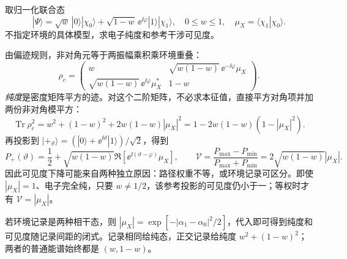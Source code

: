 \begin{exbox}[不等权两通道的纯度与干涉可见度]
取归一化联合态
\begin{equation*}
 |\Psi\rangle=\sqrt{w}\,|0\rangle|\chi_0\rangle
 +\sqrt{1-w}\,\ee^{\ii\varphi}|1\rangle|\chi_1\rangle,
 \quad 0\le w\le1,\quad \mu_X=\langle\chi_1|\chi_0\rangle.
\end{equation*}
不指定环境的具体模型，求电子纯度和参考干涉可见度。

由偏迹规则，非对角元等于两振幅乘积乘环境重叠：
\begin{equation*}
 \rho_e=\begin{pmatrix}
 w&\sqrt{w(1-w)}\,\ee^{-\ii\varphi}\mu_X\\
 \sqrt{w(1-w)}\,\ee^{\ii\varphi}\mu_X^*&1-w
 \end{pmatrix}.
\end{equation*}
\emph{纯度}是密度矩阵平方的迹。对这个二阶矩阵，不必求本征值，直接平方对角项并加两份非对角模平方：
\begin{equation*}
 \operatorname{Tr}\rho_e^2
 =w^2+(1-w)^2+2w(1-w)|\mu_X|^2
 =1-2w(1-w)(1-|\mu_X|^2).
\end{equation*}
再投影到 $|+_\vartheta\rangle=(|0\rangle+\ee^{\ii\vartheta}|1\rangle)/\sqrt2$，得到
\begin{equation*}
 P_+(\vartheta)=\frac12+\sqrt{w(1-w)}
 \Re[\ee^{\ii(\vartheta-\varphi)}\mu_X],\qquad
 \mathcal V=\frac{P_{\max}-P_{\min}}{P_{\max}+P_{\min}}
 =2\sqrt{w(1-w)}|\mu_X|.
\end{equation*}
因此可见度下降可能来自两种独立原因：路径权重不等，或环境记录可区分。即使 $|\mu_X|=1$、电子完全纯，只要 $w\ne1/2$，该参考投影的可见度仍小于一；等权时才有 $\mathcal V=|\mu_X|$。

若环境记录是两种相干态，则
$|\mu_X|=\exp[-|\alpha_1-\alpha_0|^2/2]$，代入即可得到纯度和可见度随记录间距的闭式。记录相同给纯态，正交记录给纯度 $w^2+(1-w)^2$；两者的普通能谱始终都是 $(w,1-w)$。
\end{exbox}

